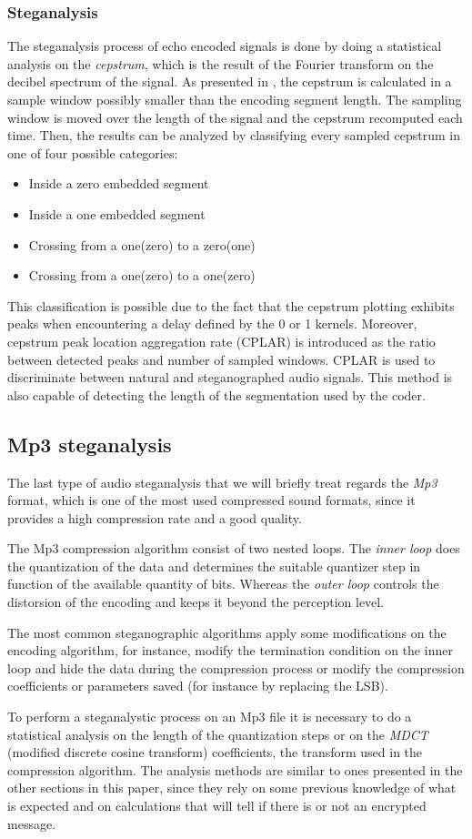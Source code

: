 \documentclass[../../main.tex]{subfiles}
\begin{document}
\subsubsection{Steganalysis}
The steganalysis process of echo encoded signals is done by doing a
statistical analysis on the \emph{cepstrum}, which is the result of the
Fourier transform on the decibel spectrum of the signal.
As presented in \cite{review-audio-steganalysis}, the cepstrum is calculated
in a sample window possibly smaller than the encoding segment length.
The sampling window is moved over the length of the signal and the cepstrum
recomputed each time.
Then, the results can be analyzed by classifying every sampled cepstrum in
one of four possible categories:
\begin{itemize}[noitemsep]
    \item Inside a zero embedded segment
    \item Inside a one embedded segment
    \item Crossing from a one(zero) to a zero(one)
    \item Crossing from a one(zero) to a one(zero)
\end{itemize}
This classification is possible due to the fact that the cepstrum plotting
exhibits peaks when encountering a delay defined by the 0 or 1 kernels.
Moreover, cepstrum peak location aggregation rate (CPLAR) is introduced as
the ratio between detected peaks and number of sampled windows.
CPLAR is used to discriminate between natural and steganographed audio
signals.
This method is also capable of detecting the length of the segmentation
used by the coder.

\subsection{Mp3 steganalysis}
The last type of audio steganalysis that we will briefly treat regards the
\emph{Mp3} format, which is one of the most used compressed sound formats,
since it provides a high compression rate and a good quality.

The Mp3 compression algorithm consist of two nested loops.
The \emph{inner loop} does the quantization of the data and determines the
suitable quantizer step in function of the available quantity of bits.
Whereas the \emph{outer loop} controls the distorsion of the encoding and
keeps it beyond the perception level.

The most common steganographic algorithms apply some modifications on the
encoding algorithm, for instance, modify the termination condition on the
inner loop and hide the data during the compression process or modify the
compression coefficients or parameters saved (for instance by replacing the
LSB).

To perform a steganalystic process on an Mp3 file it is necessary to do a
statistical analysis on the length of the quantization steps or on the
\emph{MDCT} (modified discrete cosine transform) coefficients, the transform
used in the compression algorithm.
The analysis methods are similar to ones presented in the other sections in
this paper, since they rely on some previous knowledge of what is expected
and on calculations that will tell if there is or not an encrypted message.
\end{document}
